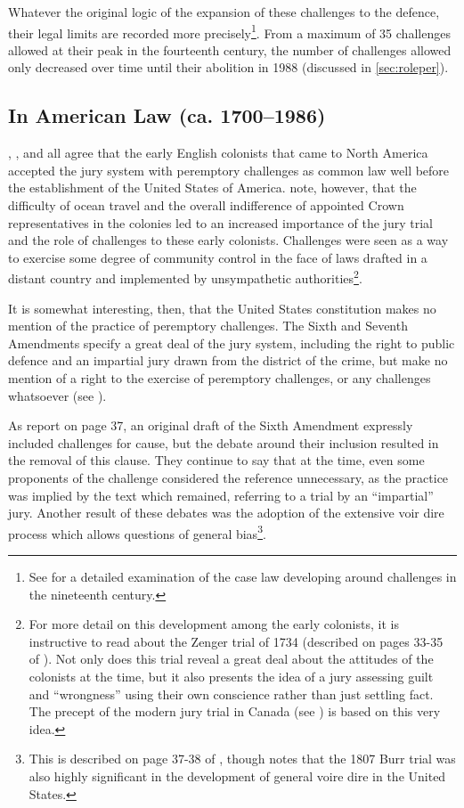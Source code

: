 Whatever the original logic of the expansion of these challenges to the defence, their legal limits are recorded more
precisely\footnote{See \cite{brown2000} for a detailed examination of the case law developing around challenges in the nineteenth
  century.}. From a maximum of 35 challenges allowed at their peak in the fourteenth century, the number of challenges allowed only
decreased over time until their abolition in 1988 (discussed in \ref{sec:roleper}).

\subsection{In American Law (ca. 1700--1986)}

\cite{vonmosch1921}, \cite{hoffman1997}, and \cite{vandykejurysel} all agree that the early English colonists that came to North
America accepted the jury system with peremptory challenges as common law well before the establishment of the United States of
America. \cite{hansvidjudging} note, however, that the difficulty of ocean travel and the overall indifference of appointed Crown
representatives in the colonies led to an increased importance of the jury trial and the role of challenges to these early
colonists. Challenges were seen as a way to exercise some degree of community control in the face of laws drafted in a distant country and implemented
by unsympathetic authorities\footnote{For more detail on this development among the early colonists, it is instructive to read
  about the Zenger trial of 1734 (described on pages 33-35 of \cite{hansvidjudging}). Not only does this trial reveal a great deal
  about the attitudes of the colonists at the time, but it also presents the idea of a jury assessing guilt and ``wrongness''
  using their own conscience rather than just settling fact. The precept of the modern jury trial in Canada (see
  \cite{woolley2018}) is based on this very idea.}.

It is somewhat interesting, then, that the United States constitution makes no mention of the practice of peremptory
challenges. The Sixth and Seventh Amendments specify a great deal of the jury system, including the right to public defence and an
impartial jury drawn from the district of the crime, but make no mention of a right to the exercise of peremptory challenges, or
any challenges whatsoever (see \cite{usconstitution}).

As \cite{hansvidjudging} report on page 37, an original draft of the Sixth Amendment expressly included challenges for cause, but
the debate around their inclusion resulted in the removal of this clause. They continue to say that at the time, even some
proponents of the challenge considered the reference unnecessary, as the practice was implied by the text which remained,
referring to a trial by an ``impartial'' jury. Another result of these debates was the adoption of the extensive voir dire process
which allows questions of general bias\footnote{This is described on page 37-38 of \cite{hansvidjudging}, though \cite{brown2000}
  notes that the 1807 Burr trial was also highly significant in the development of general voire dire in the United States.}.

